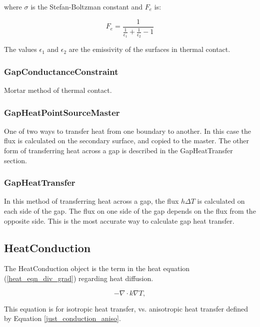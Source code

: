 \documentclass[preprint,5p]{elsarticle}
\begin{document}
where $\sigma$ is the Stefan-Boltzman constant and $F_e$ is:

\begin{equation*}
F_e = \frac{1}{\frac{1}{\epsilon_1} + \frac{1}{\epsilon_2} - 1}
\end{equation*}

The values $\epsilon_1$ and $\epsilon_2$ are the emissivity of the surfaces in thermal contact.

\subsubsection{GapConductanceConstraint}
Mortar method of thermal contact.

\subsubsection{GapHeatPointSourceMaster}
One of two ways to transfer heat from one boundary to another. In this case the flux is calculated on the secondary surface, and copied to the master. The other form of transferring heat across a gap is described in the GapHeatTransfer section.

\subsubsection{GapHeatTransfer}
In this method of transferring heat across a gap, the flux $h\Delta T$ is calculated on each side of the gap. The flux on one side of the gap depends on the flux from the opposite side. This is the most accurate way to calculate gap heat transfer.

\subsection{HeatConduction}
The HeatConduction object is the term in the heat equation (\ref{heat_eqn_div_grad}) regarding heat diffusion.

\begin{equation}
- \nabla \cdot  k\nabla T,
\end{equation}

This equation is for isotropic heat transfer, vs. anisotropic heat transfer defined by Equation \ref{just_conduction_aniso}.
\end{document}
